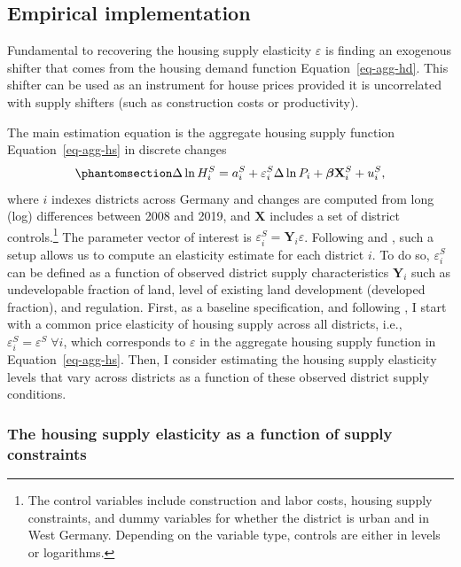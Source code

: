 \documentclass[
  12pt,
]{article}
\begin{document}
\subsection{Empirical implementation}\label{empirical-implementation}

Fundamental to recovering the housing supply elasticity \(\varepsilon\)
is finding an exogenous shifter that comes from the housing demand
function Equation~\ref{eq-agg-hd}. This shifter can be used as an
instrument for house prices provided it is uncorrelated with supply
shifters (such as construction costs or productivity).

The main estimation equation is the aggregate housing supply function
Equation~\ref{eq-agg-hs} in discrete changes
\begin{equation}\protect\phantomsection\label{eq-main}{
\Delta\ln H_i^S =  a^S_i + \varepsilon^S_i\Delta\ln P_i + \boldsymbol{\beta}\mathbf{X}^S_i + u^S_i, 
}\end{equation} where \(i\) indexes districts across Germany and changes
are computed from long (log) differences between 2008 and 2019, and
\(\mathbf{X}\) includes a set of district controls.\footnote{The control
  variables include construction and labor costs, housing supply
  constraints, and dummy variables for whether the district is urban and
  in West Germany. Depending on the variable type, controls are either
  in levels or logarithms.} The parameter vector of interest is
\(\varepsilon^S_i=\mathbf{Y}_i\varepsilon\). Following \citet{saiz_2010}
and \citet{baum-snow_han_2019}, such a setup allows us to compute an
elasticity estimate for each district \(i\). To do so,
\(\varepsilon^S_i\) can be defined as a function of observed district
supply characteristics \(\mathbf{Y}_i\) such as undevelopable fraction
of land, level of existing land development (developed fraction), and
regulation. First, as a baseline specification, and following
\citet{saiz_2010}, I start with a common price elasticity of housing
supply across all districts, i.e.,
\(\varepsilon^S_i=\varepsilon^S \;\forall i\), which corresponds to
\(\varepsilon\) in the aggregate housing supply function in
Equation~\ref{eq-agg-hs}. Then, I consider estimating the housing supply
elasticity levels that vary across districts as a function of these
observed district supply conditions.

\subsubsection{The housing supply elasticity as a function of supply
constraints}\label{sec-decompose}
\end{document}

